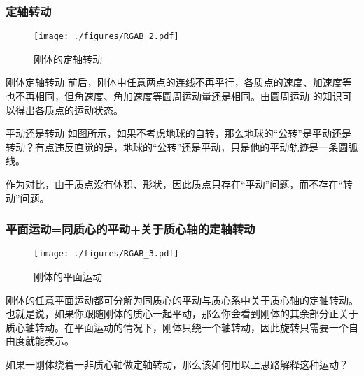 \subsubsection{定轴转动}
\begin{figure}[ht]
\centering
\texttt{[image: ./figures/RGAB\_2.pdf]}
\caption{刚体的定轴转动} \label{RGAB_fig2}
\end{figure}
刚体定轴转动 前后，刚体中任意两点的连线不再平行，各质点的速度、加速度等也不再相同，但角速度、角加速度等圆周运动量还是相同。由圆周运动  的知识可以得出各质点的运动状态。

\begin{example}{平动还是转动}
如图所示，如果不考虑地球的自转，那么地球的“公转”是平动还是转动？有点违反直觉的是，地球的“公转”还是平动，只是他的平动轨迹是一条圆弧线。
\end{example}
作为对比，由于质点没有体积、形状，因此质点只存在“平动”问题，而不存在“转动”问题。

\subsubsection{平面运动=同质心的平动+关于质心轴的定轴转动}
\begin{figure}[ht]
\centering
\texttt{[image: ./figures/RGAB\_3.pdf]}
\caption{刚体的平面运动} \label{RGAB_fig3}
\end{figure}
刚体的任意平面运动都可分解为同质心的平动与质心系中关于质心轴的定轴转动。也就是说，如果你跟随刚体的质心一起平动，那么你会看到刚体的其余部分正关于质心轴转动。在平面运动的情况下，刚体只绕一个轴转动，因此旋转只需要一个自由度就能表示。


\begin{exercise}{}
如果一刚体绕着一非质心轴做定轴转动，那么该如何用以上思路解释这种运动？
\end{exercise}

